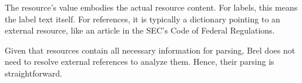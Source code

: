 The resource's value embodies the actual resource content.
For labels, this means the label text itself.
For references, it is typically a dictionary pointing to an external resource, like an article in the SEC's Code of Federal Regulations.

Given that resources contain all necessary information for parsing, Brel does not need to resolve external references to analyze them.
Hence, their parsing is straightforward.







